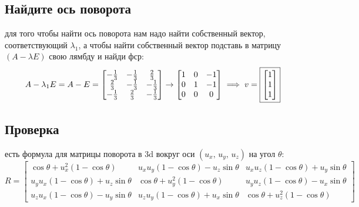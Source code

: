 \documentclass{article}
\renewcommand{\f}{\frac}
\renewcommand{\l}{\left}
\renewcommand{\r}{\right}
\begin{document}
  \subsection{Найдите ось поворота}
  для того чтобы найти ось поворота нам надо найти собственный вектор, соответствующий $\lambda_1$,
  а чтобы найти собственный вектор подставь в матрицу $(A - \lambda E)$ свою лямбду и найди фср:
  $$ A - \lambda_1 E = A - E =
  \begin{bmatrix}-\f{1}{3}&-\f{1}{3} &\f{2}{3}\\\f{2}{3}&-\f{1}{3}&-\f{1}{3}\\-\f{1}{3}&\f{2}{3}&-\f{1}{3}\end{bmatrix} \to
  \begin{bmatrix}1&0&-1\\0&1&-1\\0&0&0\end{bmatrix} \implies
  v = \fbox{$\begin{bmatrix}1\\1\\1\end{bmatrix}$}
  $$

  \subsection{Проверка}
  есть формула для матрицы поворота в 3d вокруг оси $\l(u_x,\, u_y,\, u_z\r)$ на угол $\theta$:
  $$ R = \begin{bmatrix}
    \cos \theta +u_x^2 \left(1-\cos \theta\right) & u_x u_y \left(1-\cos \theta\right) - u_z \sin \theta & u_x u_z \left(1-\cos \theta\right) + u_y \sin \theta \\
    u_y u_x \left(1-\cos \theta\right) + u_z \sin \theta & \cos \theta + u_y^2\left(1-\cos \theta\right) & u_y u_z \left(1-\cos \theta\right) - u_x \sin \theta \\
    u_z u_x \left(1-\cos \theta\right) - u_y \sin \theta & u_z u_y \left(1-\cos \theta\right) + u_x \sin \theta & \cos \theta + u_z^2\left(1-\cos \theta\right)
  \end{bmatrix} $$
\end{document}
